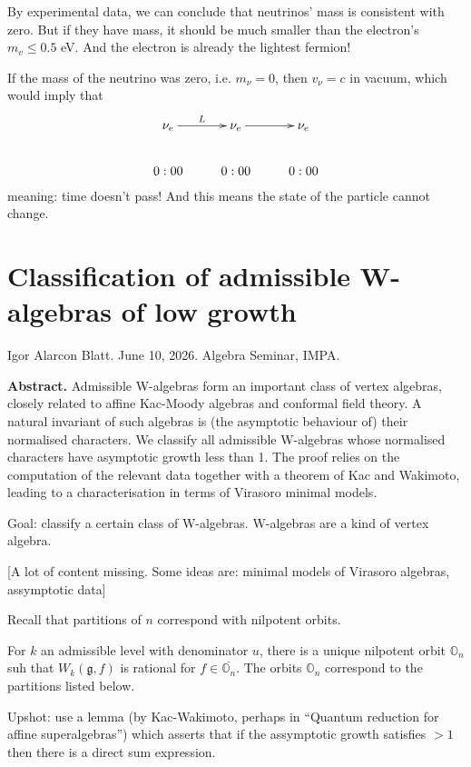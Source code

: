 By experimental data, we can conclude that
neutrinos' mass is consistent with
zero. But if they have mass, it should be
much smaller than the electron's $m_v
\leq 0.5$ eV. And the electron is already the
lightest fermion!

If the mass of the neutrino was zero, i.e.
$m_\nu=0$, then $v_\nu=c$ in vacuum,
which would imply that
$$
\xymatrix{
\nu_e\ar[r]^{L}&\nu_e\ar[r]&\nu_e\\
0:00&0:00&0:00
}
$$
meaning: time doesn't pass! And this means
the state of the particle cannot
change.

\section{Classification of admissible
W-algebras of low growth}
\label{section-w-algebras-of-low-growth}

\noindent
Igor Alarcon Blatt. June 10, 2026.
Algebra Seminar, IMPA.

\medskip\noindent
{\bf Abstract.} 
Admissible W-algebras form an important class
of vertex algebras, closely related to affine
Kac-Moody algebras and conformal field
theory. A natural invariant of such algebras
is (the asymptotic behaviour of) their
normalised characters. We classify all
admissible W-algebras whose normalised
characters have asymptotic growth less than
1. The proof relies on the computation of the
relevant data together with a theorem of Kac
and Wakimoto, leading to a characterisation
in terms of Virasoro minimal models.

\medskip\noindent
Goal: classify a certain class of W-algebras.
W-algebras are a kind of vertex algebra.

[A lot of content missing.
Some ideas are: minimal models
of Virasoro algebras,
assymptotic data]

\medskip\noindent
Recall that partitions of $n$
correspond with nilpotent orbits.

\begin{theorem}[Arakawa, 2015]
\label{theorem-arakawa}
For $k$ an admissible level with
denominator $u$, there is a unique
nilpotent orbit $\mathbb{O}_n$
suh that $W_k(\mathfrak{g},f)$
is rational for $f \in \overline{
\mathbb{O}_n}$. The orbits $\mathbb{O}_n$
correspond to the partitions listed below.
\end{theorem}

\medskip\noindent
Upshot: use a lemma 
(by Kac-Wakimoto, perhaps in
``Quantum reduction
for affine superalgebras'') which asserts
that if the assymptotic growth
satisfies $>1$ then there is a direct
sum expression.



